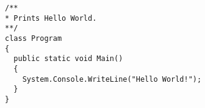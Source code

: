\documentclass{article}
\begin{document}
\begin{lstlisting}
/**
* Prints Hello World.
**/
class Program
{
  public static void Main()
  {
    System.Console.WriteLine("Hello World!");
  }
}
\end{lstlisting}

%

\end{document}
